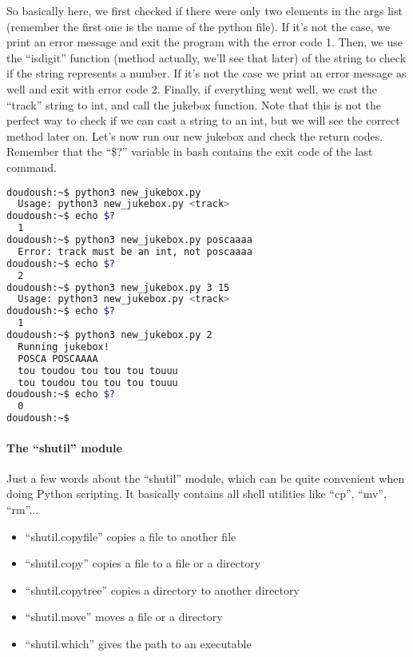 So basically here, we first checked if there were only two elements in the args
list (remember the first one is the name of the python file). If it's not the case,
we print an error message and exit the program with the error code 1. Then, we use
the ``isdigit'' function (method actually, we'll see that later) of the string
to check if the string represents a number. If it's not the case we print an error
message as well and exit with error code 2. Finally, if everything went well, we
cast the ``track'' string to int, and call the jukebox function. Note that this
is not the perfect way to check if we can cast a string to an int, but we will see
the correct method later on. Let's now run our new jukebox and check the return codes.
Remember that the ``\$?'' variable in bash contains the exit code of the last command.

\begin{lstlisting}[language=bash]
doudoush:~$ python3 new_jukebox.py
  Usage: python3 new_jukebox.py <track>
doudoush:~$ echo $?
  1
doudoush:~$ python3 new_jukebox.py poscaaaa
  Error: track must be an int, not poscaaaa
doudoush:~$ echo $?
  2
doudoush:~$ python3 new_jukebox.py 3 15
  Usage: python3 new_jukebox.py <track>
doudoush:~$ echo $?
  1
doudoush:~$ python3 new_jukebox.py 2
  Running jukebox!
  POSCA POSCAAAA
  tou toudou tou tou tou touuu
  tou toudou tou tou tou touuu
doudoush:~$ echo $?
  0
doudoush:~$
\end{lstlisting}

\vspace{5mm}

\paragraph{The ``shutil'' module}

Just a few words about the ``shutil'' module, which can be quite convenient when
doing Python scripting. It basically contains all shell utilities like ``cp'', ``mv'',
``rm''...

\begin{itemize}
\item ``shutil.copyfile'' copies a file to another file
\item ``shutil.copy'' copies a file to a file or a directory
\item ``shutil.copytree'' copies a directory to another directory
\item ``shutil.move'' moves a file or a directory
\item ``shutil.which'' gives the path to an executable
\end{itemize}

